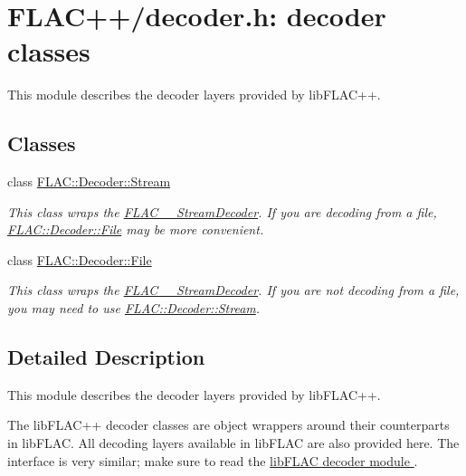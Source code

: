 \hypertarget{group__flacpp__decoder}{}\section{F\+L\+A\+C++/decoder.h\+: decoder classes}
\label{group__flacpp__decoder}


This module describes the decoder layers provided by lib\+F\+L\+A\+C++.  


\subsection*{Classes}
\begin{DoxyCompactItemize}
\item 
class \hyperlink{class_f_l_a_c_1_1_decoder_1_1_stream}{F\+L\+A\+C\+::\+Decoder\+::\+Stream}
\begin{DoxyCompactList}\small\item\em This class wraps the \hyperlink{struct_f_l_a_c_____stream_decoder}{F\+L\+A\+C\+\_\+\+\_\+\+Stream\+Decoder}. If you are decoding from a file, \hyperlink{class_f_l_a_c_1_1_decoder_1_1_file}{F\+L\+A\+C\+::\+Decoder\+::\+File} may be more convenient. \end{DoxyCompactList}\item 
class \hyperlink{class_f_l_a_c_1_1_decoder_1_1_file}{F\+L\+A\+C\+::\+Decoder\+::\+File}
\begin{DoxyCompactList}\small\item\em This class wraps the \hyperlink{struct_f_l_a_c_____stream_decoder}{F\+L\+A\+C\+\_\+\+\_\+\+Stream\+Decoder}. If you are not decoding from a file, you may need to use \hyperlink{class_f_l_a_c_1_1_decoder_1_1_stream}{F\+L\+A\+C\+::\+Decoder\+::\+Stream}. \end{DoxyCompactList}\end{DoxyCompactItemize}


\subsection{Detailed Description}
This module describes the decoder layers provided by lib\+F\+L\+A\+C++. 

The lib\+F\+L\+A\+C++ decoder classes are object wrappers around their counterparts in lib\+F\+L\+AC. All decoding layers available in lib\+F\+L\+AC are also provided here. The interface is very similar; make sure to read the \hyperlink{group__flac__decoder}{lib\+F\+L\+AC decoder module }.

